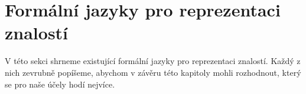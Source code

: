 \section{Formální jazyky pro reprezentaci znalostí}
V této sekci shrneme existující formální jazyky pro reprezentaci znalostí. Každý z nich zevrubně popíšeme, abychom v závěru této kapitoly mohli rozhodnout, který se pro naše účely hodí nejvíce.

